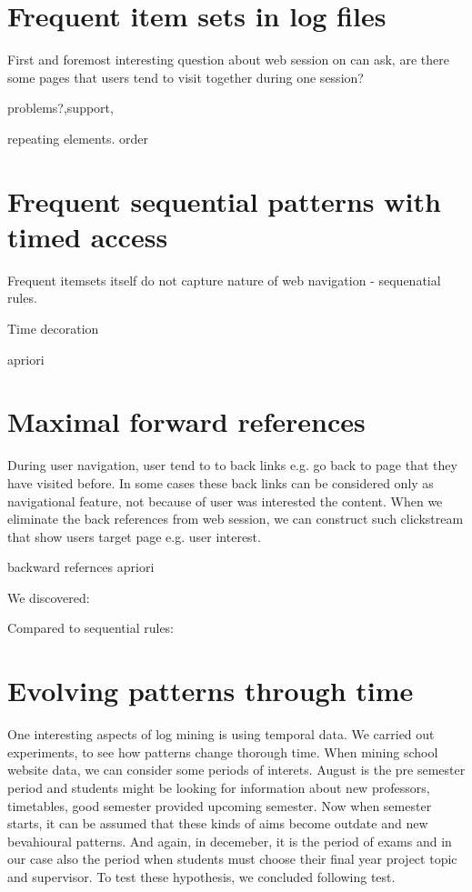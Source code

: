\documentclass[english,a4paper]{article}
\begin{document}
\section{Frequent item sets in log files} 
First and foremost interesting question about web session on can ask, are there some pages that users tend to visit together during one session?



problems?,support,

repeating elements. order


\section{Frequent sequential patterns with timed access}
Frequent itemsets itself do not capture nature of web navigation - sequenatial rules. 

Time decoration

apriori 

\section{Maximal forward references}
During user navigation, user tend to to back links e.g. go back to page that they have visited before. In some cases these back links can be considered only as navigational feature, not because of user was interested the content.  When we eliminate the back references from web session, we can construct such clickstream that show users target page e.g. user interest.

backward refernces
apriori

We discovered:

Compared to sequential rules:


\section{Evolving patterns through time} 
One interesting aspects of log mining is using temporal data. We carried out experiments, to see how patterns change thorough time. When mining school website data, we can consider some periods of interets. August is the pre semester period and students might be looking for information about new professors, timetables, good semester provided upcoming semester. Now when semester starts, it can be assumed that these kinds of aims become outdate and new bevahioural patterns. And again, in decemeber, it is the period of exams and in our case also the period when students must choose their final year project topic and supervisor. To test these hypothesis, we concluded following test. 
\end{document}
